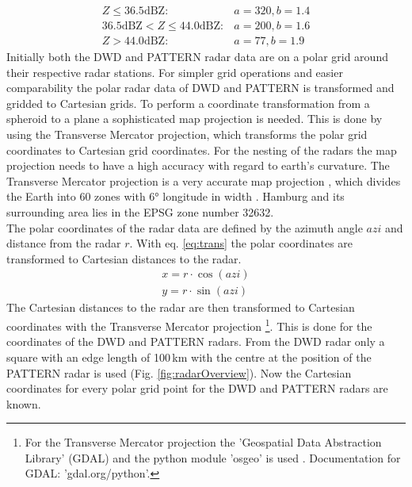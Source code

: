 \documentclass[11pt,twoside,a4paper,fleqn,x11names]{report}
\numberwithin{equation}{chapter}
\numberwithin{figure}{chapter}
\numberwithin{table}{chapter}
\begin{document}
\begin{equation}
\begin{array}{lcl}
Z \le 36.5 \text{dBZ}: & a = 320, b = 1.4 \\
36.5 \text{dBZ} < Z \le 44.0 \text{dBZ}: & a  = 200, b = 1.6 \\
Z > 44.0 \text{dBZ}: & a = 77, b = 1.9
\end{array}
\end{equation}
Initially both the DWD and PATTERN radar data are on a polar grid around their respective radar stations. For simpler grid operations and easier comparability the polar radar data of DWD and PATTERN is transformed and gridded to Cartesian grids. To perform a coordinate transformation from a spheroid to a plane a sophisticated map projection is needed. This is done by using the Transverse Mercator projection, which transforms the polar grid coordinates to Cartesian grid coordinates. For the nesting of the radars the map projection needs to have a high accuracy with regard to earth's curvature. The Transverse Mercator projection is a very accurate map projection \citep{Karney2011}, which divides the Earth into 60 zones with 6° longitude in width \citep{TMP}. Hamburg and its surrounding area lies in the EPSG zone number 32632.\\ %
The polar coordinates of the radar data are defined by the azimuth angle $azi$ and distance from the radar $r$. With eq. \ref{eq:trans} the polar coordinates are transformed to Cartesian distances to the radar.
\begin{equation}
	\begin{array}{lcl}
		x = r \cdot \cos(azi)\\
		y = r \cdot \sin(azi)
	\end{array}	
	\label{eq:trans}
\end{equation}%
The Cartesian distances to the radar are then transformed to Cartesian coordinates with the Transverse Mercator projection \footnote{For the Transverse Mercator projection the 'Geospatial Data Abstraction Library' (GDAL) and the python module 'osgeo' is used \citep{Warmerdam}. Documentation for GDAL: 'gdal.org/python'.}. This is done for the coordinates of the DWD and PATTERN radars. From the DWD radar only a square with an edge length of 100\,km with the centre at the position of the PATTERN radar is used (Fig. \ref{fig:radarOverview}). Now the Cartesian coordinates for every polar grid point for the DWD and PATTERN radars are known. 
\end{document}
